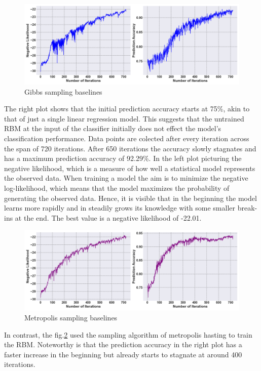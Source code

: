 \begin{figure}[H]
    \centering
    \includegraphics[width=0.9\linewidth]{graphics/CD_combined_plot.png}
    \caption{Gibbs sampling baselines}
    \label{CD_baselines}
\end{figure}
The right plot shows that the initial prediction accuracy starts at 75\%, akin to that of just a single linear regression model.
This suggests that the untrained \ac{RBM} at the input of the classifier initially does not effect the model's classification performance.
Data points are colected after every iteration across the span of 720 iterations. 
After 650 iterations the accuracy slowly stagnates and has a maximum prediction accuracy
of 92.29\%. 
In the left plot picturing the negative likelihood, which is a measure of how well a statistical model represents the observed data.
When training a model the aim is to minimize the negative log-likelihood, which means that the model maximizes the probability of generating the observed data.
Hence, it is visible that in the beginning the model learns more rapidly and in steadily grows its knowledge with some smaller break-ins at the end.
The best value is a negative likelihood of -22.01.
\begin{figure}[H]
    \centering
    \includegraphics[width=0.9\linewidth]{graphics/metropolis_combined_plot.png}
    \caption{Metropolis sampling baselines}
    \label{metropolis_baselines}
\end{figure}
In contrast, the fig.\ref{metropolis_baselines} used the sampling algorithm of metropolis hasting to train the \ac{RBM}.
Noteworthy is that the prediction accuracy in the right plot has a faster increase in the beginning but already starts to stagnate at around 400 iterations. 
